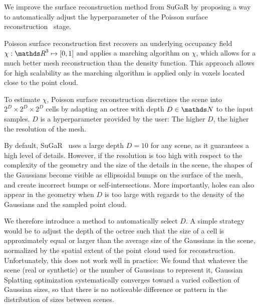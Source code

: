 
We improve the surface reconstruction method from SuGaR by proposing a way to automatically adjust the hyperparameter of the Poisson surface reconstruction~\cite{kazhdan-2006-poissonsurfacereconstruction} stage.

Poisson surface reconstruction first recovers an underlying occupancy field $\chi:\IR^3\mapsto [0,1]$
and applies a marching algorithm on $\chi$, which allows for a much better mesh reconstruction than the density function. This approach allows for high scalability as the marching algorithm is applied only in voxels located close to the point cloud. 

To estimate $\chi$, Poisson surface reconstruction discretizes the scene into $2^D \times 2^D \times 2^D$ cells by adapting an octree with depth $D\in \IN$ to the input samples.  $D$ is a hyperparameter provided by the user: The higher $D$, the higher the resolution of the mesh.

By default, SuGaR~\cite{guedon2023sugar} uses a large depth $D=10$ for any scene, as it guarantees a high level of details. However, if the resolution is too high with respect to the complexity of the geometry and the size of the details in the scene, the shapes of the Gaussians become visible as ellipsoidal bumps on the surface of the mesh, and create incorrect bumps or self-intersections. More importantly, holes can also appear in the geometry when $D$ is too large with regards to the density of the Gaussians and the sampled point cloud.



We therefore introduce a method to automatically select $D$. A simple strategy would be to adjust the depth of the octree such that the size of a cell is approximately equal or larger than the average size of the Gaussians in the scene, normalized by the spatial extent of the point cloud used for reconstruction. Unfortunately, this does not work well in practice: We found that whatever the scene (real or synthetic) or the number of Gaussians to represent it, Gaussian Splatting optimization systematically converges toward a varied collection of Gaussian sizes, so that there is no noticeable difference or pattern in the distribution of sizes between scenes.

